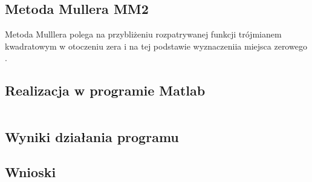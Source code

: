 \documentclass[a4paper, 11pt]{article}
\begin{document}
\subsection{Metoda Mullera MM2}
Metoda Mulllera polega na przybliżeniu rozpatrywanej funkcji trójmianem kwadratowym w otoczeniu zera i na tej podstawie wyznaczeniia miejsca zerowego . 


\subsection{Realizacja w programie Matlab}
\begin{lstlisting}

\end{lstlisting}

\vspace{2cm}

\subsection{Wyniki działania programu}

\vspace{10cm}
\subsection{Wnioski}

	
\end{document}
